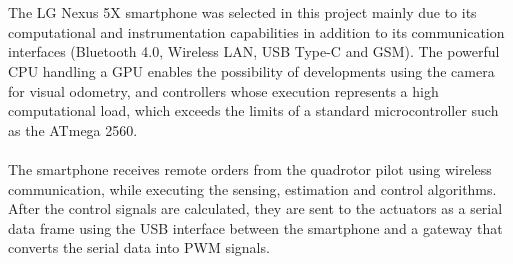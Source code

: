 \\\\
The LG Nexus 5X smartphone was selected in this project mainly due to its computational and instrumentation capabilities in addition to its communication interfaces (Bluetooth 4.0, Wireless LAN, USB Type-C and GSM). The powerful CPU handling a GPU enables the possibility of developments using the camera for visual odometry, and controllers whose execution represents a high computational load, which exceeds the limits of a standard microcontroller such as the ATmega 2560.
\\\\
The smartphone receives remote orders from the quadrotor pilot using wireless communication, while executing the sensing, estimation and control algorithms. After the control signals are calculated, they are sent to the actuators as a serial data frame using the USB interface between the smartphone and a gateway that converts the serial data into PWM signals.

